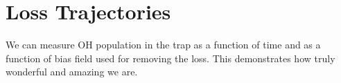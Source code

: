 \documentclass[%
 reprint,
 amsmath,amssymb,
 aps,
prl,
]{revtex4-1}
\begin{document}
\section{Loss Trajectories}
We can measure OH population in the trap as a function of time and as a function of bias field used for removing the loss. This demonstrates how truly wonderful and amazing we are.


\nocite{*}


\end{document}
